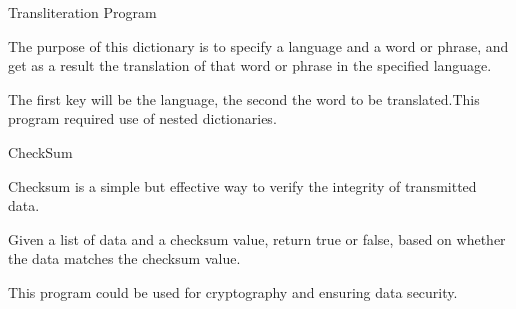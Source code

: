 \documentclass{resume} %
\begin{document}
\begin{rWorkSection} {Transliteration Program}

  {
  \item The purpose of this dictionary is to specify a language and a word or phrase, and get as a result the translation of that word or phrase in the specified language. 
  \item The first key will be the language, the second the word to be translated.This program required use of nested dictionaries.
  
  }
\end{rWorkSection}

\begin{rWorkSection} {CheckSum}
  {
  \item Checksum is a simple but effective way to verify the integrity of transmitted data.  
  \item Given a list of data and a checksum value, return true or false, based on whether the data matches the checksum value.
  \item This program could be used for cryptography and ensuring data security.
  }
\end{rWorkSection}









\end{document}
